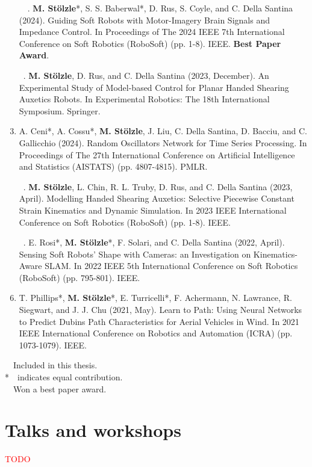\begin{enumerate}
  \item[\faFileTextO \, \faTrophy \, \stepcounter{enumi}\arabic{enumi}.] \textbf{M. Stölzle}*, S. S. Baberwal*, D. Rus, S. Coyle, and C. Della Santina (2024). Guiding Soft Robots with Motor-Imagery Brain Signals and Impedance Control. In Proceedings of The 2024 IEEE 7th International Conference on Soft Robotics (RoboSoft) (pp. 1-8). IEEE. \textbf{Best Paper Award}.
  \item[\faFileTextO \, \stepcounter{enumi}\arabic{enumi}.] \textbf{M. Stölzle}, D. Rus, and C. Della Santina (2023, December). An Experimental Study of Model-based Control for Planar Handed Shearing Auxetics Robots. In Experimental Robotics: The 18th International Symposium. Springer.
  \item A. Ceni*, A. Cossu*, \textbf{M. Stölzle}, J. Liu, C. Della Santina, D. Bacciu, and C. Gallicchio (2024). Random Oscillators Network for Time Series Processing. In Proceedings of The 27th International Conference on Artificial Intelligence and Statistics (AISTATS) (pp. 4807-4815). PMLR.
  \item[\faFileTextO \, \stepcounter{enumi}\arabic{enumi}.] \textbf{M. Stölzle}, L. Chin, R. L. Truby, D. Rus, and C. Della Santina (2023, April). Modelling Handed Shearing Auxetics: Selective Piecewise Constant Strain Kinematics and Dynamic Simulation. In 2023 IEEE International Conference on Soft Robotics (RoboSoft) (pp. 1-8). IEEE.
  \item[\faFileTextO \, \stepcounter{enumi}\arabic{enumi}.] E. Rosi*, \textbf{M. Stölzle}*, F. Solari, and C. Della Santina (2022, April). Sensing Soft Robots' Shape with Cameras: an Investigation on Kinematics-Aware SLAM. In 2022 IEEE 5th International Conference on Soft Robotics (RoboSoft) (pp. 795-801). IEEE.
  \item T. Phillips*, \textbf{M. Stölzle}*, E. Turricelli*, F. Achermann, N. Lawrance, R. Siegwart, and J. J. Chu (2021, May). Learn to Path: Using Neural Networks to Predict Dubins Path Characteristics for Aerial Vehicles in Wind. In 2021 IEEE International Conference on Robotics and Automation (ICRA) (pp. 1073-1079). IEEE.
\end{enumerate}

\vspace{0.5cm}
\noindent
\faFileTextO~~Included in this thesis.\\
*~~indicates equal contribution.\\
\faTrophy~~Won a best paper award.

\section*{Talks and workshops}
\textcolor{red}{TODO}